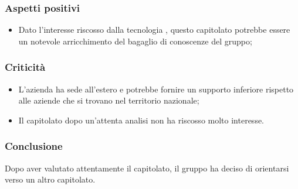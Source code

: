     
    \subsubsection{Aspetti positivi}
	    \begin{itemize}
    			\item Dato l'interesse riscosso dalla tecnologia , questo capitolato potrebbe essere un notevole arricchimento del bagaglio di conoscenze del gruppo;
    	   \end{itemize}
    \subsubsection{Criticità}
    	   \begin{itemize}
    			\item L'azienda ha sede all'estero e potrebbe fornire un supporto inferiore rispetto alle aziende che si trovano nel territorio nazionale;
    			\item Il capitolato dopo un'attenta analisi non ha riscosso molto interesse.
    	   \end{itemize}
    \subsubsection{Conclusione}
	Dopo aver valutato attentamente il capitolato, il gruppo ha deciso di orientarsi verso un altro capitolato.
